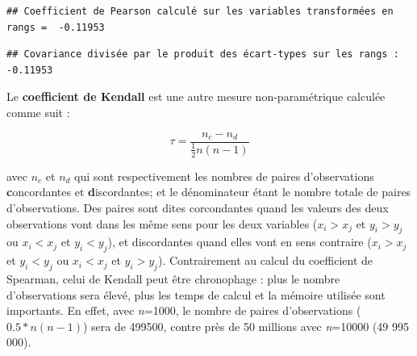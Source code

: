 \documentclass[
  11pt,
  french,
]{book}
\makeatletter
\newenvironment{Shaded}{\begin{snugshade}}{\end{snugshade}}
\newcommand{\CommentTok}[1]{\textcolor[rgb]{0.56,0.35,0.01}{\textit{#1}}}
\newcommand{\DecValTok}[1]{\textcolor[rgb]{0.00,0.00,0.81}{#1}}
\newcommand{\KeywordTok}[1]{\textcolor[rgb]{0.13,0.29,0.53}{\textbf{#1}}}
\newcommand{\NormalTok}[1]{#1}
\newcommand{\OperatorTok}[1]{\textcolor[rgb]{0.81,0.36,0.00}{\textbf{#1}}}
\newcommand{\StringTok}[1]{\textcolor[rgb]{0.31,0.60,0.02}{#1}}
\newenvironment{kframe}{%
\medskip{}
\setlength{\fboxsep}{.8em}
 \def\at@end@of@kframe{}%
 \ifinner\ifhmode%
  \def\at@end@of@kframe{\end{minipage}}%
  \begin{minipage}{\columnwidth}%
 \fi\fi%
 \def\FrameCommand##1{\hskip\@totalleftmargin \hskip-\fboxsep
 \colorbox{shadecolor}{##1}\hskip-\fboxsep
     \hskip-\linewidth \hskip-\@totalleftmargin \hskip\columnwidth}%
 \MakeFramed {\advance\hsize-\width
   \@totalleftmargin\z@ \linewidth\hsize
   \@setminipage}}%
 {\par\unskip\endMakeFramed%
 \at@end@of@kframe}
\renewenvironment{Shaded}{\begin{kframe}}{\end{kframe}}
\makeatother
\begin{document}
\begin{verbatim}
## Coefficient de Pearson calculé sur les variables transformées en rangs =  -0.11953
\end{verbatim}

\begin{Shaded}
\end{Shaded}

\begin{verbatim}
## Covariance divisée par le produit des écart-types sur les rangs : -0.11953
\end{verbatim}

Le \textbf{coefficient de Kendall} est une autre mesure non-paramétrique calculée comme suit :

\begin{equation} 
\tau = \frac{n_{c}-n_{d}}{\frac{1}{2}n(n-1)}
\label{eq:tau}
\end{equation}

avec \(n_{c}\) et \(n_{d}\) qui sont respectivement les nombres de paires d'observations \textbf{c}oncordantes et \textbf{d}iscordantes; et le dénominateur étant le nombre totale de paires d'observations. Des paires sont dites corcondantes quand les valeurs des deux observations vont dans les même sens pour les deux variables (\(x_{i}>x_{j}\) et \(y_{i}>y_{j}\) ou \(x_{i}<x_{j}\) et \(y_{i}<y_{j}\)), et discordantes quand elles vont en sens contraire (\(x_{i}>x_{j}\) et \(y_{i}<y_{j}\) ou \(x_{i}<x_{j}\) et \(y_{i}>y_{j}\)). Contrairement au calcul du coefficient de Spearman, celui de Kendall peut être chronophage : plus le nombre d'observations sera élevé, plus les temps de calcul et la mémoire utilisée sont importants. En effet, avec \emph{n}=1000, le nombre de paires d'observations (\({0.5*n(n-1)}\)) sera de 499500, contre près de 50 millions avec \emph{n}=10000 (49 995 000).
\end{document}
